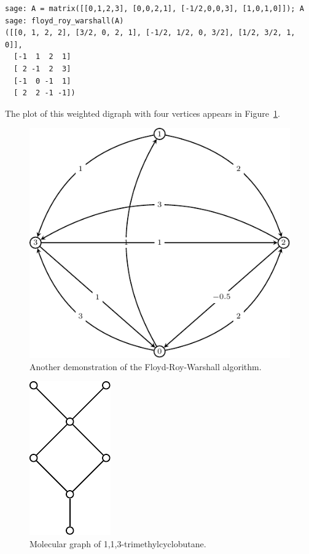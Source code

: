 \begin{lstlisting}
sage: A = matrix([[0,1,2,3], [0,0,2,1], [-1/2,0,0,3], [1,0,1,0]]); A
sage: floyd_roy_warshall(A)
([[0, 1, 2, 2], [3/2, 0, 2, 1], [-1/2, 1/2, 0, 3/2], [1/2, 3/2, 1, 0]],
  [-1  1  2  1]
  [ 2 -1  2  3]
  [-1  0 -1  1]
  [ 2  2 -1 -1])
\end{lstlisting}

The plot of this weighted digraph with four vertices appears in
Figure~\ref{fig:graph_algorithms:another_Floyd_Roy_Warshall_demo}.

\begin{figure}[!htbp]
\centering
\includegraphics{image/graph-algorithms/another-Floyd-Roy-Warshall-demo}
\caption{Another demonstration of the Floyd-Roy-Warshall algorithm.}
\label{fig:graph_algorithms:another_Floyd_Roy_Warshall_demo}
\end{figure}

\begin{figure}[!htbp]
\centering
\includegraphics{image/graph-algorithms/trimethylcyclobutane}
\caption{Molecular graph of 1,1,3-trimethylcyclobutane.}
\label{fig:graph_algorithms:trimethylcyclobutane}
\end{figure}

